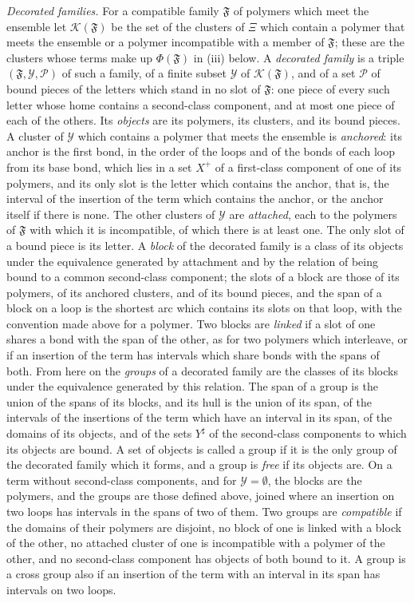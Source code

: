 \documentclass[11pt]{preprint}
\numberwithin{equation}{section}
\theoremstyle{definition}
\theoremstyle{remark}
\theoremstyle{plain}
\begin{document}
\emph{Decorated families.} For a compatible family $\mathfrak F$ of polymers which meet the ensemble let $\mathcal K(\mathfrak F)$ be the set of the clusters of $\Xi$ which contain a polymer that meets the ensemble or a polymer incompatible with a member of $\mathfrak F$; these are the clusters whose terms make up $\Phi(\mathfrak F)$ in (iii) below. A \emph{decorated family} is a triple $(\mathfrak F, \mathcal Y, \mathcal P)$ of such a family, of a finite subset $\mathcal Y$ of $\mathcal K(\mathfrak F)$, and of a set $\mathcal P$ of bound pieces of the letters which stand in no slot of $\mathfrak F$: one piece of every such letter whose home contains a second-class component, and at most one piece of each of the others. Its \emph{objects} are its polymers, its clusters, and its bound pieces. A cluster of $\mathcal Y$ which contains a polymer that meets the ensemble is \emph{anchored}: its anchor is the first bond, in the order of the loops and of the bonds of each loop from its base bond, which lies in a set $X^+$ of a first-class component of one of its polymers, and its only slot is the letter which contains the anchor, that is, the interval of the insertion of the term which contains the anchor, or the anchor itself if there is none. The other clusters of $\mathcal Y$ are \emph{attached}, each to the polymers of $\mathfrak F$ with which it is incompatible, of which there is at least one. The only slot of a bound piece is its letter. A \emph{block} of the decorated family is a class of its objects under the equivalence generated by attachment and by the relation of being bound to a common second-class component; the slots of a block are those of its polymers, of its anchored clusters, and of its bound pieces, and the span of a block on a loop is the shortest arc which contains its slots on that loop, with the convention made above for a polymer. Two blocks are \emph{linked} if a slot of one shares a bond with the span of the other, as for two polymers which interleave, or if an insertion of the term has intervals which share bonds with the spans of both. From here on the \emph{groups} of a decorated family are the classes of its blocks under the equivalence generated by this relation. The span of a group is the union of the spans of its blocks, and its hull is the union of its span, of the intervals of the insertions of the term which have an interval in its span, of the domains of its objects, and of the sets $Y^\sharp$ of the second-class components to which its objects are bound. A set of objects is called a group if it is the only group of the decorated family which it forms, and a group is \emph{free} if its objects are. On a term without second-class components, and for $\mathcal Y = \emptyset$, the blocks are the polymers, and the groups are those defined above, joined where an insertion on two loops has intervals in the spans of two of them. Two groups are \emph{compatible} if the domains of their polymers are disjoint, no block of one is linked with a block of the other, no attached cluster of one is incompatible with a polymer of the other, and no second-class component has objects of both bound to it. A group is a cross group also if an insertion of the term with an interval in its span has intervals on two loops.
\end{document}

